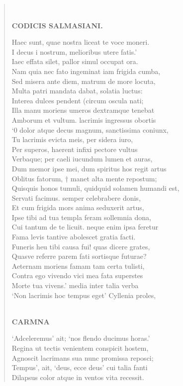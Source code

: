 \documentclass[11pt, a4paper]{report}
\begin{document}
\begin{verse}
        ﻿\pagebreak 
    \begin{center} \textbf{CODICIS SALMASIANI.} \end{center} \marginpar{[55]} Haec sunt, quae nostra liceat te voce moneri. \\ I decus i nostrum, melioribus utere fatis.’ \\ Iaec effata silet, pallor simul occupat ora. \\ Nam quia nec fato ingeminat iam frigida cumba, \\ Sed misera ante diem, matrum de more locuta, \\ Multa patri mandata dabat, solatia luctus: \\ Interea dulces pendent  \lbrack (circum \rbrack  oscula nati; \\ Illa manu moriens umeros dextramque tenebat \\ Amborum et vultum. lacrimis ingressus obortis \\ ‘0 dolor atque decus magnum, sanctissima coniunx, \\ Tu lacrimis evicta meis, per sidera iuro, \\ Per superos, haerent infixi pectore vultus \\ Verbaque; per caeli iucundum lumen et auras, \\ Dum memor ipse mei, dum spiritus hos regit artus \\ Oblitus fatorum, † \rbrack  manet alta mente repostum; \\ Quisquis honos tumuli, quidquid solamen humandi est, \\ Servati facimus. semper celebrabere donis, \\ Et cum frigida mors anima seduxerit artus, \\ Ipse tibi ad tua templa feram sollemnia dona, \\ Cui tantum de te licuit. neque enim ipsa feretur \\ Fama levis tantive abolescet gratia facti. \\ Funeris heu tibi causa fui! quas dicere grates, \\ Quasve referre parem fati sortisque futurae? \\ Aeternam moriens famam tam certa tulisti, \\ Contra ego vivendo vici mea fata superstes \\ Morte tua vivens.’ media inter talia verba \\ ‘Non lacrimis hoc tempus eget’ Cyllenia proles, \\ 
        ﻿\pagebreak 
    \begin{center} \textbf{CARMNA} \end{center} \marginpar{[56]} ‘Adceleremus’ ait; ‘nos flendo ducimus horas.’ \\ Regina ut tectis venientem conspicit hostem, \\ Agnoscit lacrimans sua nunc promissa reposci; \\ Tempus’, ait, ‘deus, ecce deus’ cui talia fanti \\ Dilapsus color atque in ventos vita recessit. \\ 
      \end{verse}
  
\end{document}
